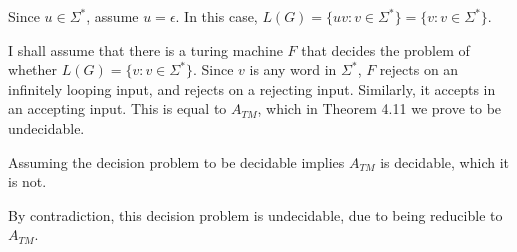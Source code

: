 
\vskip 0.3in


\vskip 0.3in

\noindent Since $u \in \Sigma^*$, assume $u = \epsilon$. In this case, $L(G) = \{uv : v \in \Sigma^*\} = \{v : v \in \Sigma^*\}$.

\vskip 0.1in

\noindent I shall assume that there is a turing machine $F$ that decides the problem of
whether $L(G) = \{v : v \in \Sigma^*\}$. Since $v$ is any word in $\Sigma^*$, $F$ rejects on
an infinitely looping input, and rejects on a rejecting input. Similarly, it accepts in an accepting
input. This is equal to $A_{TM}$, which in Theorem 4.11 we prove to be undecidable.

\vskip 0.1in

\noindent Assuming the decision problem to be decidable implies $A_{TM}$ is decidable, which it is not.

\vskip 0.1in

\noindent By contradiction, this decision problem is undecidable, due to being reducible to $A_{TM}$.